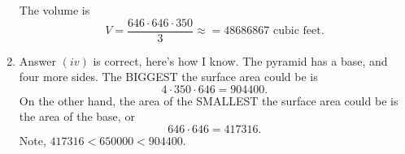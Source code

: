 \documentclass[nooutcomes,noauthor,hints]{ximera}
\begin{document}
\begin{question}
\begin{freeResponse}
\begin{enumerate}
        The volume is
        \[
        V = \frac{646\cdot 646\cdot 350}{3} \approx = 48686867 \text{ cubic feet}.
        \]
      \item Answer $(iv)$ is correct, here's how I know. The pyramid
        has a base, and four more sides. The BIGGEST the surface area could be is
        \[
        4\cdot 350\cdot 646 = 904400.
        \]
        On the other hand, the area of the SMALLEST the surface area could be is
        the area of the base, or
        \[
        646\cdot 646 = 417316.
        \]
        Note, $417316 < 650000 <  904400$.        
    \end{enumerate}
  \end{freeResponse}
\end{question}
\mynewpage
\end{document}
